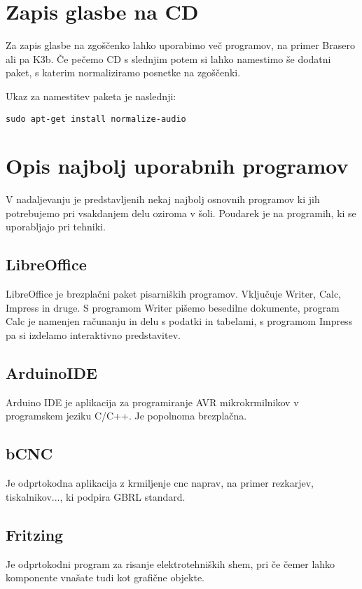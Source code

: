 \documentclass[12pt,a4paper,twoside]{article}
\begin{document}
\newpage

\section{Zapis glasbe na CD}
Za zapis glasbe na zgoščenko lahko uporabimo več programov, na  primer Brasero ali pa K3b. Če pečemo CD s slednjim potem si lahko namestimo še dodatni paket, s katerim normaliziramo posnetke na zgoščenki. 

Ukaz za namestitev paketa je naslednji: 

\texttt{sudo apt-get install normalize-audio}


\section{Opis najbolj uporabnih programov}
V nadaljevanju je predstavljenih nekaj najbolj osnovnih programov ki jih potrebujemo pri vsakdanjem delu oziroma v šoli. Poudarek je na programih, ki se uporabljajo pri tehniki. 

\subsection{LibreOffice}
LibreOffice je brezplačni paket pisarniških programov. Vključuje Writer, Calc, Impress in druge. S programom Writer pišemo besedilne dokumente, program Calc je namenjen računanju in delu s podatki in tabelami, s programom Impress pa si izdelamo interaktivno predstavitev. 


\subsection{ArduinoIDE}
Arduino IDE je aplikacija za programiranje AVR mikrokrmilnikov v programskem jeziku C/C++. Je popolnoma brezplačna. 

\subsection{bCNC}
Je odprtokodna aplikacija z krmiljenje cnc naprav, na primer rezkarjev, tiskalnikov..., ki podpira GBRL standard. 

\subsection{Fritzing}
Je odprtokodni program za risanje elektrotehniških shem, pri če čemer lahko komponente vnašate tudi kot grafične objekte. 
\end{document}
